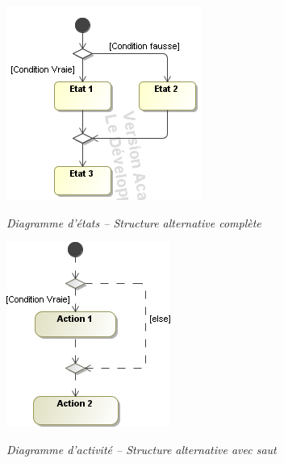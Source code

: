 \documentclass[10pt]{article}
\begin{document}
\begin{minipage}[c]{.48\linewidth}
\begin{center}
\includegraphics[width=.8\textwidth]{images/Condition_stm}

\textit{Diagramme d'états -- Structure alternative complète}
\end{center}
\end{minipage} \hfill
\begin{minipage}[c]{.48\linewidth}
\begin{center}
\includegraphics[width=.6\textwidth]{images/Condition_act}

\textit{Diagramme d'activité -- Structure alternative avec saut}
\end{center}
\end{minipage}
\end{document}
